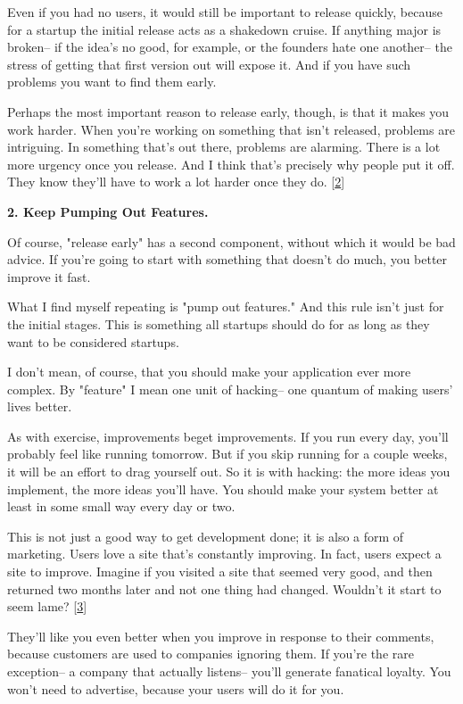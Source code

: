 Even if you had no users, it would still be important to release
quickly, because for a startup the initial release acts as a shakedown
cruise.  If anything major is broken-- if the idea's no good,
for example, or the founders hate one another-- the stress of getting
that first version out will expose it.  And if you have such problems
you want to find them early.

Perhaps the most important reason to release early, though, is that
it makes you work harder.  When you're working on something that
isn't released, problems are intriguing.  In something that's out
there, problems are alarming.  There is a lot more urgency once you
release.  And I think that's precisely why people put it off.  They
know they'll have to work a lot harder once they do. 
[\href{\#f2n}{2}]


\textbf{2. Keep Pumping Out Features.}

Of course, "release early" has a second component, without which
it would be bad advice.  If you're going to start with something
that doesn't do much, you better improve it fast.

What I find myself repeating is "pump out features."  And this rule
isn't just for the initial stages.  This is something all startups
should do for as long as they want to be considered startups.

I don't mean, of course, that you should make your application ever
more complex.  By "feature" I mean one unit of hacking-- one quantum
of making users' lives better.

As with exercise, improvements beget improvements.  If you run every
day, you'll probably feel like running tomorrow.  But if you skip
running for a couple weeks, it will be an effort to drag yourself
out.  So it is with hacking: the more ideas you implement, the more
ideas you'll have.  You should make your system better at least in
some small way every day or two.

This is not just a good way to get development done; it is also a
form of marketing.  Users love a site that's constantly improving.
In fact, users expect a site to improve.  Imagine if you visited a
site that seemed very good, and then returned two months later and
not one thing had changed.  Wouldn't it start to seem lame? 
[\href{\#f3n}{3}]

They'll like you even better when you improve in response to their
comments, because customers are used to companies ignoring them.
If you're the rare exception-- a company that actually listens--
you'll generate fanatical loyalty.  You won't need to advertise,
because your users will do it for you.


